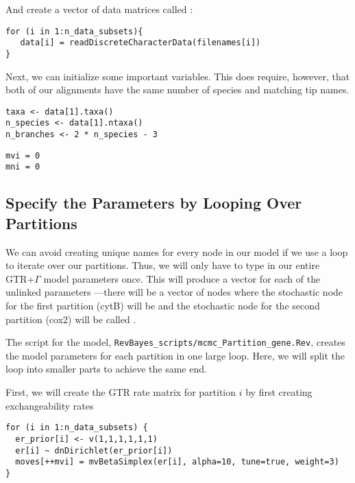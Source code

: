 And create a vector of data matrices called :
{\tt \begin{snugshade*}
\begin{lstlisting}
for (i in 1:n_data_subsets){
   data[i] = readDiscreteCharacterData(filenames[i])
}
\end{lstlisting}
\end{snugshade*}}

Next, we can initialize some important variables. 
This does require, however, that both of our alignments have the same number of species and matching tip names.
{\tt \begin{snugshade*}
\begin{lstlisting}
taxa <- data[1].taxa()
n_species <- data[1].ntaxa()
n_branches <- 2 * n_species - 3
\end{lstlisting}
\end{snugshade*}}

{\tt \begin{snugshade*}
\begin{lstlisting}
mvi = 0 
mni = 0
\end{lstlisting}
\end{snugshade*}}


\subsection{Specify the Parameters by Looping Over Partitions}

We can avoid creating unique names for every node in our model if we use a  loop to iterate over our partitions. Thus, we will only have to type in our entire GTR+$\Gamma$ model parameters once. 
This will produce a vector for each of the unlinked parameters ---\EG there will be a vector of  nodes where the stochastic node for the first partition (cytB) will be  and the stochastic node for the second partition (cox2) will be called .

The script for the model, {\tt RevBayes\_scripts/mcmc\_Partition\_gene.Rev}, creates the model parameters for each partition in one large loop.
Here, we will split the loop into smaller parts to achieve the same end.

First, we will create the GTR rate matrix for partition $i$ by first creating exchangeability rates
{\tt \small \begin{snugshade*}
\begin{lstlisting}
for (i in 1:n_data_subsets) {
  er_prior[i] <- v(1,1,1,1,1,1)
  er[i] ~ dnDirichlet(er_prior[i])
  moves[++mvi] = mvBetaSimplex(er[i], alpha=10, tune=true, weight=3) 
}
\end{lstlisting}
\end{snugshade*}}

